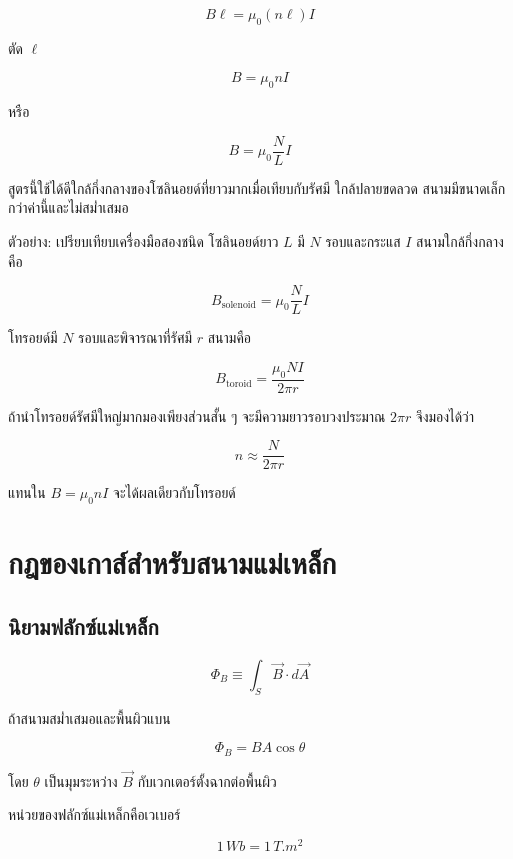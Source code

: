 \[
B\ell
=
\mu_0(n\ell)I
\]

ตัด $\ell$

\begin{tcolorbox}[title={สนามภายในโซลินอยด์อุดมคติ}]
\[
\boxed{B=\mu_0nI}
\]

หรือ

\[
\boxed{B=\mu_0\frac{N}{L}I}
\]
\end{tcolorbox}

สูตรนี้ใช้ได้ดีใกล้กึ่งกลางของโซลินอยด์ที่ยาวมากเมื่อเทียบกับรัศมี ใกล้ปลายขดลวด สนามมีขนาดเล็กกว่าค่านี้และไม่สม่ำเสมอ

\begin{examplebox}{ตัวอย่าง: เปรียบเทียบเครื่องมือสองชนิด}
โซลินอยด์ยาว $L$ มี $N$ รอบและกระแส $I$ สนามใกล้กึ่งกลางคือ

\[
B_{\text{solenoid}}
=
\mu_0\frac{N}{L}I
\]

โทรอยด์มี $N$ รอบและพิจารณาที่รัศมี $r$ สนามคือ

\[
B_{\text{toroid}}
=
\frac{\mu_0NI}{2\pi r}
\]

ถ้านำโทรอยด์รัศมีใหญ่มากมองเพียงส่วนสั้น ๆ จะมีความยาวรอบวงประมาณ $2\pi r$ จึงมองได้ว่า

\[
n\approx\frac{N}{2\pi r}
\]

แทนใน $B=\mu_0nI$ จะได้ผลเดียวกับโทรอยด์
\end{examplebox}

\section{กฎของเกาส์สำหรับสนามแม่เหล็ก}

\subsection{นิยามฟลักซ์แม่เหล็ก}

\begin{tcolorbox}[title={นิยาม: ฟลักซ์แม่เหล็กผ่านพื้นผิว}]
\[
\boxed{
\Phi_B
\equiv
\int_S\vec{B}\cdot d\vec{A}}
\]
\end{tcolorbox}

ถ้าสนามสม่ำเสมอและพื้นผิวแบน

\[
\Phi_B=BA\cos\theta
\]

โดย $\theta$ เป็นมุมระหว่าง $\vec{B}$ กับเวกเตอร์ตั้งฉากต่อพื้นผิว

หน่วยของฟลักซ์แม่เหล็กคือเวเบอร์

\[
1\,\si{Wb}=1\,\si{T.m^2}
\]

